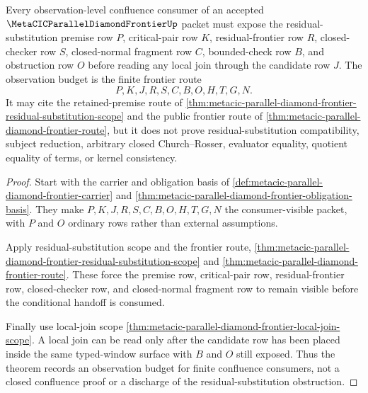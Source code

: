 \begin{theorem}
\label{thm:metacic-observation-confluence-budget}
Every observation-level confluence consumer of an accepted $\MetaCICParallelDiamondFrontierUp$ packet must expose the residual-substitution premise row $P$, critical-pair row $K$, residual-frontier row $R$, closed-checker row $S$, closed-normal fragment row $C$, bounded-check row $B$, and obstruction row $O$ before reading any local join through the candidate row $J$. The observation budget is the finite frontier route
$$
P,K,J,R,S,C,B,O,H,T,G,N .
$$
It may cite the retained-premise route of \autoref{thm:metacic-parallel-diamond-frontier-residual-substitution-scope} and the public frontier route of \autoref{thm:metacic-parallel-diamond-frontier-route}, but it does not prove residual-substitution compatibility, subject reduction, arbitrary closed Church--Rosser, evaluator equality, quotient equality of terms, or kernel consistency.
\end{theorem}
\begin{proof}
Start with the carrier and obligation basis of \autoref{def:metacic-parallel-diamond-frontier-carrier} and \autoref{thm:metacic-parallel-diamond-frontier-obligation-basis}. They make $P,K,J,R,S,C,B,O,H,T,G,N$ the consumer-visible packet, with $P$ and $O$ ordinary rows rather than external assumptions.

Apply residual-substitution scope and the frontier route, \autoref{thm:metacic-parallel-diamond-frontier-residual-substitution-scope} and \autoref{thm:metacic-parallel-diamond-frontier-route}. These force the premise row, critical-pair row, residual-frontier row, closed-checker row, and closed-normal fragment row to remain visible before the conditional handoff is consumed.

Finally use local-join scope \autoref{thm:metacic-parallel-diamond-frontier-local-join-scope}. A local join can be read only after the candidate row has been placed inside the same typed-window surface with $B$ and $O$ still exposed. Thus the theorem records an observation budget for finite confluence consumers, not a closed confluence proof or a discharge of the residual-substitution obstruction.
\end{proof}
